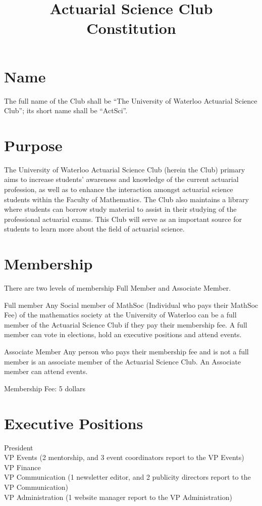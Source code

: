\documentclass[11pt]{mathsoc}
\title{Actuarial Science Club Constitution}
\begin{document}

\setcounter{tocdepth}{4}
{\large \tableofcontents}

\newpage

\section{Name}
The full name of the Club shall be “The University of Waterloo Actuarial 
Science Club”; its short name shall be “ActSci”.

\section{Purpose}
The University of Waterloo Actuarial Science Club (herein the Club) primary 
aims to increase students’ awareness and knowledge of the current actuarial 
profession, as well as to enhance the interaction amongst actuarial science 
students within the Faculty of Mathematics. The Club also maintains a library 
where students can borrow study material to assist in their studying of the 
professional actuarial exams.  This Club will serve as an important source for 
students to learn more about the field of actuarial science.  

\section{Membership}
There are two levels of membership Full Member and Associate Member.

Full member
Any Social member of MathSoc (Individual who pays their MathSoc Fee) of the 
mathematics society at the University of Waterloo can be a full member of the 
Actuarial Science Club if they pay their membership fee. A full member can 
vote in elections, hold an executive positions and attend events.

Associate Member
Any person who pays their membership fee and is not a full member is an 
associate  member of the Actuarial Science Club.  An Associate member can 
attend events.  

Membership Fee: 5 dollars

\section{Executive Positions}
President\\
VP Events (2 mentorship, and 3 event coordinators report to the VP Events)\\
VP Finance\\
VP Communication (1 newsletter editor, and 2 publicity directors report to the 
VP Communication)\\
VP Administration (1 website manager report to the VP Administration)\\
\end{document}
